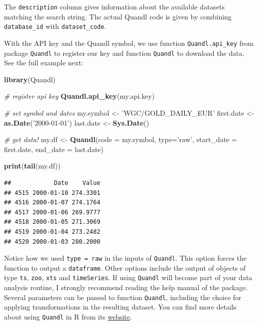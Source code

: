 \documentclass[11pt,]{book}
\newenvironment{Shaded}{\begin{snugshade}}{\end{snugshade}}
\newcommand{\KeywordTok}[1]{\textcolor[rgb]{0.27,0.27,0.27}{\textbf{#1}}}
\newcommand{\DataTypeTok}[1]{\textcolor[rgb]{0.27,0.27,0.27}{#1}}
\newcommand{\StringTok}[1]{\textcolor[rgb]{0.5,0.5,0.5}{#1}}
\newcommand{\CommentTok}[1]{\textcolor[rgb]{0.56,0.35,0.01}{\textit{#1}}}
\newcommand{\NormalTok}[1]{#1}
\begin{document}
The \texttt{description} column gives information about the available
datasets matching the search string. The actual Quandl code is given by
combining \texttt{database\_id} with \texttt{dataset\_code}.

With the API key and the Quandl symbol, we use function
\texttt{Quandl.api\_key} from package \texttt{Quandl} to register our
key and function \texttt{Quandl} to download the data. See the full
example next:  

\begin{Shaded}
\begin{Highlighting}[]
\KeywordTok{library}\NormalTok{(Quandl)}

\CommentTok{# register api key}
\KeywordTok{Quandl.api_key}\NormalTok{(my.api.key)}

\CommentTok{# set symbol and dates}
\NormalTok{my.symbol <-}\StringTok{ 'WGC/GOLD_DAILY_EUR'}
\NormalTok{first.date <-}\StringTok{ }\KeywordTok{as.Date}\NormalTok{(}\StringTok{'2000-01-01'}\NormalTok{)}
\NormalTok{last.date <-}\StringTok{ }\KeywordTok{Sys.Date}\NormalTok{()}

\CommentTok{# get data!}
\NormalTok{my.df <-}\StringTok{ }\KeywordTok{Quandl}\NormalTok{(}\DataTypeTok{code =}\NormalTok{ my.symbol,}
                \DataTypeTok{type=}\StringTok{'raw'}\NormalTok{, }
                \DataTypeTok{start_date =}\NormalTok{ first.date,}
                \DataTypeTok{end_date =}\NormalTok{ last.date)}

\KeywordTok{print}\NormalTok{(}\KeywordTok{tail}\NormalTok{(my.df))}
\end{Highlighting}
\end{Shaded}

\begin{verbatim}
##            Date    Value
## 4515 2000-01-10 274.3301
## 4516 2000-01-07 274.1764
## 4517 2000-01-06 269.9777
## 4518 2000-01-05 271.3069
## 4519 2000-01-04 273.2482
## 4520 2000-01-03 280.2000
\end{verbatim}

Notice how we used
\texttt{type\ =\ \textquotesingle{}raw\textquotesingle{}} in the inputs
of \texttt{Quandl}. This option forces the function to output a
\texttt{dataframe}. Other options include the output of objects of type
\texttt{ts}, \texttt{zoo}, \texttt{xts} and \texttt{timeSeries}. If
using \texttt{Quandl} will become part of your data analysis routine, I
strongly recommend reading the help manual of the package. Several
parameters can be passed to function \texttt{Quandl}, including the
choice for applying transformations in the resulting dataset. You can
find more details about using \texttt{Quandl} in R from its
\href{https://docs.quandl.com/docs/r}{website}.
\end{document}
